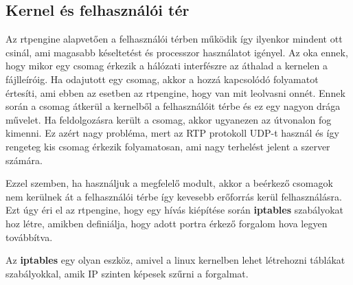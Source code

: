 \subsection{Kernel és felhasználói tér}

Az rtpengine alapvetően a felhasználói térben működik így ilyenkor mindent ott csinál, ami
magasabb késeltetést és processzor használatot igényel. Az oka ennek, hogy mikor egy csomag
érkezik a hálózati interfészre az áthalad a kernelen a fájlleíróig. Ha odajutott egy 
csomag, akkor a hozzá kapcsolódó folyamatot értesíti, ami ebben az esetben az rtpengine, hogy
van mit leolvasni onnét. Ennek során a csomag átkerül a kernelből a felhasználóit térbe és 
ez egy nagyon drága művelet. Ha feldolgozásra került a csomag, akkor ugyanezen az útvonalon
fog kimenni. Ez azért nagy probléma, mert az RTP protokoll UDP-t használ és így rengeteg 
kis csomag érkezik folyamatosan, ami nagy terhelést jelent a szerver számára. 

Ezzel szemben, ha használjuk a megfelelő modult, akkor a beérkező csomagok nem kerülnek át a 
felhasználói térbe így kevesebb erőforrás kerül felhasználásra. Ezt úgy éri el az rtpengine,
hogy egy hívás kiépítése során \textbf{iptables} szabályokat hoz létre, amikben definiálja, hogy
adott portra érkező forgalom hova legyen továbbítva. 

Az \textbf{iptables} egy olyan eszköz, amivel a linux kernelben lehet létrehozni 
táblákat szabályokkal, amik IP szinten képesek szűrni a forgalmat. 



